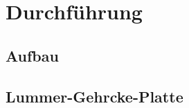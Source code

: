 \section{Durchführung}
\label{sec:Durchführung}
\subsection{Aufbau}

\subsection{Lummer-Gehrcke-Platte}
